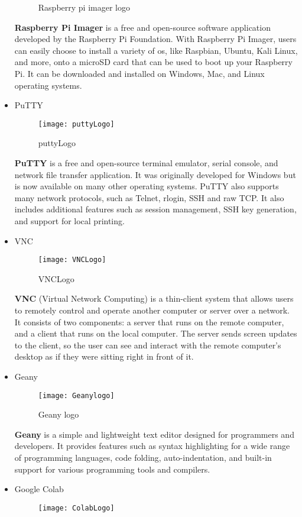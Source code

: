 \begin{itemize}
\begin{figure}[h]
        \caption{Raspberry pi imager logo}
        \label{fig:raspberry-pi-imagerLogo}
    \end{figure}
\FloatBarrier
\subitem\textbf{Raspberry Pi Imager}  is a free and open-source software application developed by the Raspberry Pi Foundation.\cite{RSND}
With Raspberry Pi Imager, users can easily choose to install a variety of os, like Raspbian, Ubuntu, Kali Linux, and more,  onto a microSD card that can be used to boot up your Raspberry Pi.
\subitem  It can be downloaded and installed on Windows, Mac, and Linux operating systems.\cite{RSND}
 \item PuTTY
\FloatBarrier
\begin{figure}[h]
       \centering
        \texttt{[image: puttyLogo]}
   
        \caption{puttyLogo}
        \label{fig:}
    \end{figure}
\FloatBarrier
\subitem\textbf{PuTTY} is a free and open-source terminal emulator, serial console, and network file transfer application. It was originally developed for Windows but is now available on many other operating systems.\cite{PYND}
\subitem PuTTY also supports many network protocols, such as Telnet, rlogin, SSH and raw TCP. It also includes additional features such as session management, SSH key generation, and support for local printing.\cite{PYND}
 \item VNC
\FloatBarrier
\begin{figure}[h]
       \centering
        \texttt{[image: VNCLogo]}
   
        \caption{VNCLogo}
        \label{fig:VNCLogo}
    \end{figure}
\FloatBarrier
\subitem\textbf{VNC } (Virtual Network Computing) is a thin-client system that allows users to remotely control and operate another computer or server over a network. It consists of two components: a server that runs on the remote computer, and a client that runs on the local computer.\cite{RVND}
\subitem  The server sends screen updates to the client, so the user can see and interact with the remote computer's desktop as if they were sitting right in front of it.\cite{RVND}
  \item Geany
\begin{figure}[h]
         \centering
        \texttt{[image: Geanylogo]}
   
        \caption{Geany logo}
        \label{fig:Geanylogo}
    \end{figure}
\FloatBarrier
\subitem\textbf{Geany} is a simple and lightweight text editor designed for programmers and developers. It provides features such as syntax highlighting for a wide range of programming languages, code folding, auto-indentation, and built-in support for various programming tools and compilers.\cite{GND}
  \item Google Colab
\begin{figure}[h]
         \centering
        \texttt{[image: ColabLogo]}
   

\end{figure}
\end{itemize}
